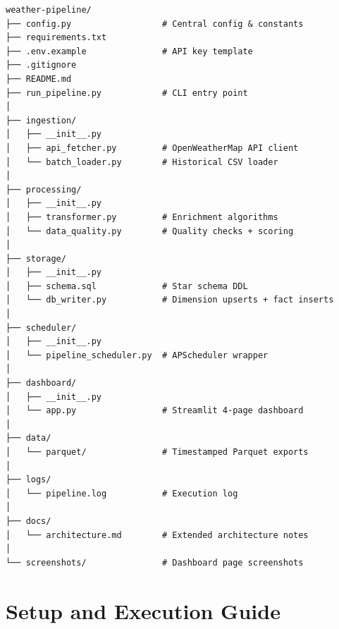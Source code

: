 \documentclass[12pt,a4paper]{report}
\begin{document}
\begin{lstlisting}[style=bashstyle, caption={Full project directory layout}]
weather-pipeline/
├── config.py                  # Central config & constants
├── requirements.txt
├── .env.example               # API key template
├── .gitignore
├── README.md
├── run_pipeline.py            # CLI entry point
│
├── ingestion/
│   ├── __init__.py
│   ├── api_fetcher.py         # OpenWeatherMap API client
│   └── batch_loader.py        # Historical CSV loader
│
├── processing/
│   ├── __init__.py
│   ├── transformer.py         # Enrichment algorithms
│   └── data_quality.py        # Quality checks + scoring
│
├── storage/
│   ├── __init__.py
│   ├── schema.sql             # Star schema DDL
│   └── db_writer.py           # Dimension upserts + fact inserts
│
├── scheduler/
│   ├── __init__.py
│   └── pipeline_scheduler.py  # APScheduler wrapper
│
├── dashboard/
│   ├── __init__.py
│   └── app.py                 # Streamlit 4-page dashboard
│
├── data/
│   └── parquet/               # Timestamped Parquet exports
│
├── logs/
│   └── pipeline.log           # Execution log
│
├── docs/
│   └── architecture.md        # Extended architecture notes
│
└── screenshots/               # Dashboard page screenshots
\end{lstlisting}

\chapter{Setup and Execution Guide}
\end{document}
